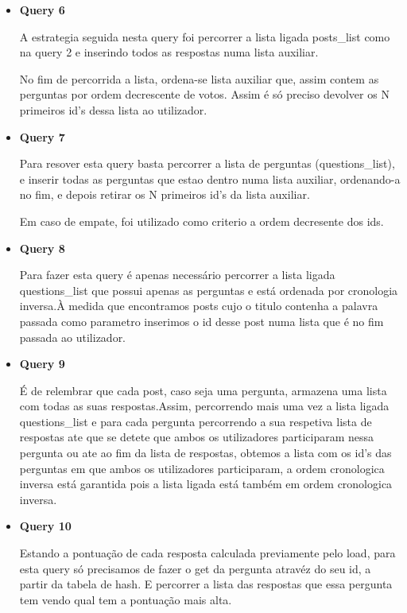 \documentclass[a4paper,10pt]{article}
\begin{document}
\begin{itemize}
  \item \textbf{Query 6}
    
    \quad\quad A estrategia seguida nesta query foi percorrer a lista ligada posts\_list como na query 2 e inserindo todos as respostas numa lista auxiliar.

    \quad\quad No fim de percorrida a lista, ordena-se lista auxiliar que, assim contem as perguntas por ordem decrescente de votos. Assim \'e s\'o preciso devolver os N primeiros id's dessa lista ao utilizador.
    
  \item \textbf{Query 7}
    
    \quad\quad Para resover esta query basta percorrer a lista de perguntas (questions\_list), e inserir todas as perguntas que estao dentro numa lista auxiliar, ordenando-a no fim, e depois retirar os N primeiros id's da lista auxiliar.

    \quad\quad Em caso de empate, foi utilizado como criterio a ordem decresente dos ids.
  
  \item \textbf{Query 8}
    
    \quad\quad Para fazer esta query \'e apenas necess\'ario percorrer a lista ligada questions\_list que possui apenas as perguntas e est\'a ordenada por cronologia inversa.\`A medida que encontramos posts cujo o titulo contenha a palavra passada como parametro inserimos o id desse post numa lista que \'e no fim passada ao utilizador.
    
  \item \textbf{Query 9}
    
    \quad\quad \'E de relembrar que cada post, caso seja uma pergunta, armazena uma lista com todas as suas respostas.Assim, percorrendo mais uma vez a lista ligada questions\_list e para cada pergunta percorrendo a sua respetiva lista de respostas ate que se detete que ambos os utilizadores participaram nessa pergunta ou ate ao fim da lista de respostas, obtemos a lista com os id's das perguntas em que ambos os utilizadores participaram, a ordem cronologica inversa est\'a garantida pois a lista ligada est\'a tamb\'em em ordem cronologica inversa.
    
  \item \textbf{Query 10}
    
    \quad\quad Estando a pontua\c{c}\~ao de cada resposta calculada previamente pelo load, para esta query s\'o precisamos de fazer o get da pergunta atrav\'ez do seu id, a partir da tabela de hash. E percorrer a lista das respostas que essa pergunta tem vendo qual tem a pontua\c{c}\~ao mais alta.
    

\end{itemize}
\end{document}
